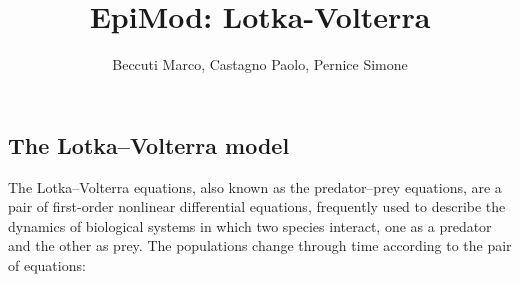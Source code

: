 \documentclass[
]{article}
\title{EpiMod: Lotka-Volterra}
\author{Beccuti Marco, Castagno Paolo, Pernice Simone}
\date{}
\begin{document}
\maketitle

{
\setcounter{tocdepth}{3}
\tableofcontents
}
\hypertarget{the-lotkavolterra-model}{%
\subsection{The Lotka--Volterra model}\label{the-lotkavolterra-model}}

The Lotka--Volterra equations, also known as the predator--prey
equations, are a pair of first-order nonlinear differential equations,
frequently used to describe the dynamics of biological systems in which
two species interact, one as a predator and the other as prey. The
populations change through time according to the pair of equations:
\end{document}
